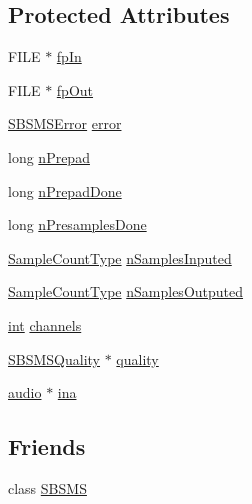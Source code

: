 \subsection*{Protected Attributes}
\begin{DoxyCompactItemize}
\item 
F\+I\+LE $\ast$ \hyperlink{class__sbsms___1_1_s_b_s_m_s_imp_a5fe7b904d708d2b56f08d64443cd94e9}{fp\+In}
\item 
F\+I\+LE $\ast$ \hyperlink{class__sbsms___1_1_s_b_s_m_s_imp_a494f8877f2cdb66b9412430c55229fd3}{fp\+Out}
\item 
\hyperlink{namespace__sbsms___af8e4cc216d7a51d2de2c5ce55eb3ce19}{S\+B\+S\+M\+S\+Error} \hyperlink{class__sbsms___1_1_s_b_s_m_s_imp_a3b87b3f6e4f27a91f433a570d2af9239}{error}
\item 
long \hyperlink{class__sbsms___1_1_s_b_s_m_s_imp_a34ba3b055c49b299f72f3acdf7d85af2}{n\+Prepad}
\item 
long \hyperlink{class__sbsms___1_1_s_b_s_m_s_imp_a093ad9df18ed58d771bd312feaf33a4c}{n\+Prepad\+Done}
\item 
long \hyperlink{class__sbsms___1_1_s_b_s_m_s_imp_a3b779535c5510798dd1362fda5104089}{n\+Presamples\+Done}
\item 
\hyperlink{namespace__sbsms___ae4ba47977e7e07f5945e529e2256b662}{Sample\+Count\+Type} \hyperlink{class__sbsms___1_1_s_b_s_m_s_imp_af73f14410515992faf9eedc709119a5b}{n\+Samples\+Inputed}
\item 
\hyperlink{namespace__sbsms___ae4ba47977e7e07f5945e529e2256b662}{Sample\+Count\+Type} \hyperlink{class__sbsms___1_1_s_b_s_m_s_imp_a9cf344abb17c2158ce6fa7c31df94469}{n\+Samples\+Outputed}
\item 
\hyperlink{xmltok_8h_a5a0d4a5641ce434f1d23533f2b2e6653}{int} \hyperlink{class__sbsms___1_1_s_b_s_m_s_imp_abd260927c70ac1e41c4b37b3445eae69}{channels}
\item 
\hyperlink{class__sbsms___1_1_s_b_s_m_s_quality}{S\+B\+S\+M\+S\+Quality} $\ast$ \hyperlink{class__sbsms___1_1_s_b_s_m_s_imp_ad1b294ed77e52813409d048751af118c}{quality}
\item 
\hyperlink{namespace__sbsms___a11786cc5bd221ff534972ae350477324}{audio} $\ast$ \hyperlink{class__sbsms___1_1_s_b_s_m_s_imp_a9ccb8d9d7c918add37972c40d1eaa51c}{ina}
\end{DoxyCompactItemize}
\subsection*{Friends}
\begin{DoxyCompactItemize}
\item 
class \hyperlink{class__sbsms___1_1_s_b_s_m_s_imp_a46dd97e89bc87c82bf3edfae55f98d0b}{S\+B\+S\+MS}
\end{DoxyCompactItemize}


